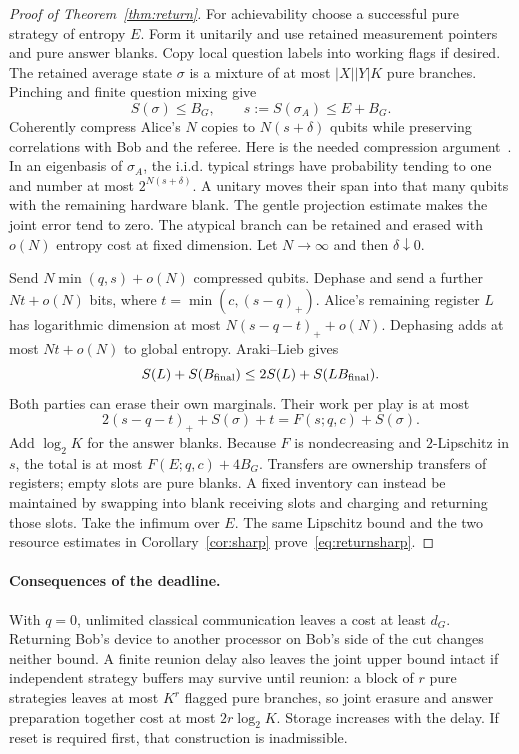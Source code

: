 \begin{proof}[Proof of Theorem~\ref{thm:return}]
For achievability choose a successful pure strategy of entropy $E$. Form it unitarily and use retained measurement pointers and pure answer blanks. Copy local question labels into working flags if desired. The retained average state $\sigma$ is a mixture of at most $|X||Y|K$ pure branches. Pinching and finite question mixing give
\[
 S(\sigma)\le B_G,\qquad s:=S(\sigma_A)\le E+B_G.
\]
Coherently compress Alice's $N$ copies to $N(s+\delta)$ qubits while preserving correlations with Bob and the referee. Here is the needed compression argument~\cite{schumacher}. In an eigenbasis of $\sigma_A$, the i.i.d. typical strings have probability tending to one and number at most $2^{N(s+\delta)}$. A unitary moves their span into that many qubits with the remaining hardware blank. The gentle projection estimate makes the joint error tend to zero. The atypical branch can be retained and erased with $o(N)$ entropy cost at fixed dimension. Let $N\to\infty$ and then $\delta\downarrow0$.

Send $N\min(q,s)+o(N)$ compressed qubits. Dephase and send a further $Nt+o(N)$ bits, where $t=\min(c,(s-q)_+)$. Alice's remaining register $L$ has logarithmic dimension at most $N(s-q-t)_++o(N)$. Dephasing adds at most $Nt+o(N)$ to global entropy. Araki--Lieb gives
\[
 S(L)+S(B_{\rm final})\le2S(L)+S(LB_{\rm final}).
\]
Both parties can erase their own marginals. Their work per play is at most
\[
 2(s-q-t)_++S(\sigma)+t=F(s;q,c)+S(\sigma).
\]
Add $\log_2K$ for the answer blanks. Because $F$ is nondecreasing and $2$-Lipschitz in $s$, the total is at most $F(E;q,c)+4B_G$. Transfers are ownership transfers of registers; empty slots are pure blanks. A fixed inventory can instead be maintained by swapping into blank receiving slots and charging and returning those slots. Take the infimum over $E$. The same Lipschitz bound and the two resource estimates in Corollary~\ref{cor:sharp} prove~\eqref{eq:returnsharp}.
\end{proof}

\paragraph{Consequences of the deadline.}
With $q=0$, unlimited classical communication leaves a cost at least $d_G$. Returning Bob's device to another processor on Bob's side of the cut changes neither bound. A finite reunion delay also leaves the joint upper bound intact if independent strategy buffers may survive until reunion: a block of $r$ pure strategies leaves at most $K^r$ flagged pure branches, so joint erasure and answer preparation together cost at most $2r\log_2K$. Storage increases with the delay. If reset is required first, that construction is inadmissible.

